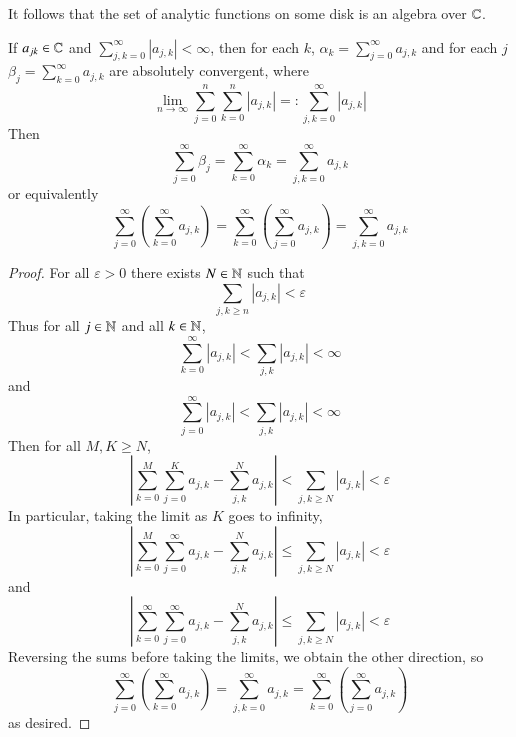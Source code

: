 It follows that the set of analytic functions on some disk is an algebra over $\mathbb C$.

\begin{prop}\label{prop:3.3.6}
    If $a_{jk} \in \mathbb C$ and $\sum_{j,k=0}^{\infty}|a_{j,k}| < \infty$, then for each $k$, $\alpha_k = \sum_{j=0}^{\infty}a_{j,k}$ and for each $j$ $\beta_j = \sum_{k=0}^{\infty}a_{j,k}$ are absolutely convergent, where \begin{equation*}
        \lim\limits_{n\rightarrow \infty}\sum_{j=0}^n\sum_{k=0}^n|a_{j,k}| =: \sum_{j,k=0}^{\infty}|a_{j,k}|
    \end{equation*}
    Then \begin{equation*}
        \sum_{j=0}^{\infty}\beta_j = \sum_{k=0}^{\infty}\alpha_k = \sum_{j,k=0}^{\infty}a_{j,k}
    \end{equation*}
    or equivalently \begin{equation*}
        \sum_{j=0}^{\infty}\left(\sum_{k=0}^{\infty}a_{j,k}\right)= \sum_{k=0}^{\infty}\left(\sum_{j=0}^{\infty}a_{j,k}\right) = \sum_{j,k=0}^{\infty}a_{j,k}
    \end{equation*}
\end{prop}
\begin{proof}
    For all $\varepsilon > 0$ there exists $N \in \mathbb N$ such that $$\sum_{j,k\geq n}|a_{j,k}| < \varepsilon$$ Thus for all $j \in \mathbb N$ and all $k \in \mathbb N$, $$\sum_{k=0}^{\infty}|a_{j,k}| < \sum_{j,k}|a_{j,k}| < \infty$$ and $$\sum_{j=0}^{\infty}|a_{j,k}| < \sum_{j,k}|a_{j,k}| <\infty$$ Then for all $M,K \geq N$, $$\left|\sum_{k=0}^M\sum_{j=0}^Ka_{j,k} - \sum_{j,k}^Na_{j,k}\right| < \sum_{j,k \geq N}|a_{j,k}| < \varepsilon$$ In particular, taking the limit as $K$ goes to infinity, $$\left|\sum_{k=0}^M\sum_{j=0}^{\infty}a_{j,k} - \sum_{j,k}^Na_{j,k}\right| \leq \sum_{j,k \geq N}|a_{j,k}| < \varepsilon$$
    and $$\left|\sum_{k=0}^{\infty}\sum_{j=0}^{\infty}a_{j,k} - \sum_{j,k}^Na_{j,k}\right| \leq \sum_{j,k \geq N}|a_{j,k}| < \varepsilon$$
    Reversing the sums before taking the limits, we obtain the other direction, so \begin{equation*}
        \sum_{j=0}^{\infty}\left(\sum_{k=0}^{\infty}a_{j,k}\right) = \sum_{j,k=0}^{\infty}a_{j,k} = \sum_{k=0}^{\infty}\left(\sum_{j=0}^{\infty}a_{j,k}\right)
    \end{equation*}
    as desired.
\end{proof}

